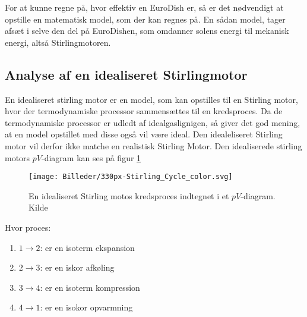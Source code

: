 \documentclass[SRC.tex]{subfiles}
\begin{document}
	
	For at kunne regne på, hvor effektiv en EuroDish er, så er det nødvendigt at opstille
	en matematisk model, som der kan regnes på. En sådan model, tager afsæt i selve den del
	på EuroDishen, som omdanner solens energi til mekanisk energi, altså Stirlingmotoren. 
	
	\subsection{Analyse af en idealiseret Stirlingmotor}
	En idealiseret stirling motor er en model, som kan opstilles til en 
	Stirling motor, hvor der termodynamiske processor sammensættes til en kredsproces. Da 
	de termodynamiske processor er udledt af idealgaslignigen, så giver det 
	god mening, at en model opstillet med disse også vil være ideal. Den idealeliseret Stirling motor vil derfor ikke matche en realistisk Stirling Motor. Den idealiserede stirling motors \(pV\)-diagram kan ses på figur \ref{fig:stirlingcycle}
	
	\begin{figure}[h!]
		\centering
		\texttt{[image: Billeder/330px-Stirling\_Cycle\_color.svg]}
		\caption{En idealiseret Stirling motos kredsproces indtegnet i et \(pV\)-diagram. Kilde}
		\label{fig:stirlingcycle}
	\end{figure}
	

	Hvor proces:
	\begin{enumerate}[]
		\item \quad \(1 \rightarrow 2\): er en isoterm ekspansion
		\item \quad \(2 \rightarrow 3\): er en iskor afkøling
		\item \quad \(3 \rightarrow 4\): er en isoterm kompression
		\item \quad \(4 \rightarrow 1\): er en isokor opvarmning
	\end{enumerate}
	
	
\end{document}
